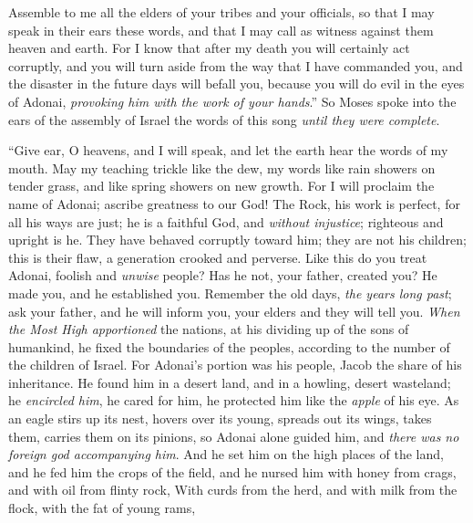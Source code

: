 \begin{biblechapter}
\verse Assemble to me all the elders of your tribes and your officials, so that I may speak in their ears these words, and that I may call as witness against them heaven and earth.
\verse For I know that after my death you will certainly act corruptly, and you will turn aside from the way that I have commanded you, and the disaster in the future days will befall you, because you will do evil in the eyes of Adonai, \textit{provoking him with the work of your hands}.”
\verse So Moses spoke into the ears of the assembly of Israel the words of this song \textit{until they were complete}.
\end{biblechapter}

\begin{biblechapter} %
 “Give ear, O heavens, and I will speak, 
and let the earth hear the words of my mouth.
\verse May my teaching trickle like the dew, 
my words like rain showers on tender grass, 
and like spring showers on new growth.
\verse For I will proclaim the name of Adonai; 
ascribe greatness to our God!
\verse The Rock, his work is perfect, 
for all his ways are just; 
he is a faithful God, and \textit{without injustice}; 
righteous and upright is he.
\verse They have behaved corruptly toward him; 
they are not his children; this is their flaw, 
a generation crooked and perverse.
\verse Like this do you treat Adonai, 
foolish and \textit{unwise} people? 
Has he not, your father, created you? 
He made you, and he established you.
\verse Remember the old days, \textit{the years long past}; 
ask your father, and he will inform you, 
your elders and they will tell you.
\verse \textit{When the Most High apportioned} the nations, 
at his dividing up of the sons of humankind, 
he fixed the boundaries of the peoples, 
according to the number of the children of Israel.
\verse For Adonai’s portion was his people, 
Jacob the share of his inheritance.
\verse He found him in a desert land, 
and in a howling, desert wasteland; 
he \textit{encircled him}, he cared for him, 
he protected him like the \textit{apple} of his eye.
\verse As an eagle stirs up its nest, 
hovers over its young, 
spreads out its wings, takes them, 
carries them on its pinions,
\verse so Adonai alone guided him, 
and \textit{there was no foreign god accompanying him}.
\verse And he set him on the high places of the land, 
and he fed him the crops of the field, 
and he nursed him with honey from crags, 
and with oil from flinty rock,
\verse With curds from the herd, 
and with milk from the flock, 
with the fat of young rams, 

\end{biblechapter}

